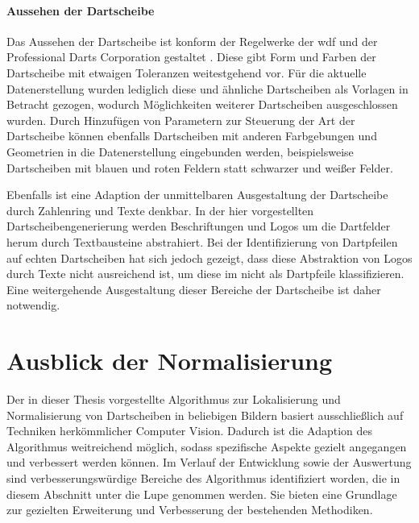 
\paragraph{Aussehen der Dartscheibe}

Das Aussehen der Dartscheibe ist konform der Regelwerke der \ac{wdf} und der Professional Darts Corporation gestaltet \cite{wdf-rules,pdc_rules}. Diese gibt Form und Farben der Dartscheibe mit etwaigen Toleranzen weitestgehend vor. Für die aktuelle Datenerstellung wurden lediglich diese und ähnliche Dartscheiben als Vorlagen in Betracht gezogen, wodurch Möglichkeiten weiterer Dartscheiben ausgeschlossen wurden. Durch Hinzufügen von Parametern zur Steuerung der Art der Dartscheibe können ebenfalls Dartscheiben mit anderen Farbgebungen und Geometrien in die Datenerstellung eingebunden werden, beispielsweise Dartscheiben mit blauen und roten Feldern statt schwarzer und weißer Felder.

Ebenfalls ist eine Adaption der unmittelbaren Ausgestaltung der Dartscheibe durch Zahlenring und Texte denkbar. In der hier vorgestellten Dartscheibengenerierung werden Beschriftungen und Logos um die Dartfelder herum durch Textbausteine abstrahiert. Bei der Identifizierung von Dartpfeilen auf echten Dartscheiben hat sich jedoch gezeigt, dass diese Abstraktion von Logos durch Texte nicht ausreichend ist, um diese im nicht als Dartpfeile klassifizieren. Eine weitergehende Ausgestaltung dieser Bereiche der Dartscheibe ist daher notwendig.



\section{Ausblick der Normalisierung}
\label{sec:ausblick_cv}

Der in dieser Thesis vorgestellte Algorithmus zur Lokalisierung und Normalisierung von Dartscheiben in beliebigen Bildern basiert ausschließlich auf Techniken herkömmlicher Computer Vision. Dadurch ist die Adaption des Algorithmus weitreichend möglich, sodass spezifische Aspekte gezielt angegangen und verbessert werden können. Im Verlauf der Entwicklung sowie der Auswertung sind verbesserungswürdige Bereiche des Algorithmus identifiziert worden, die in diesem Abschnitt unter die Lupe genommen werden. Sie bieten eine Grundlage zur gezielten Erweiterung und Verbesserung der bestehenden Methodiken.

